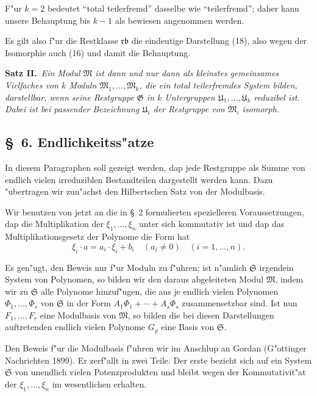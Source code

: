 \documentclass[12pt,a4paper]{article}
\begin{document}
F"ur $k=2$ bedeutet ``total teilerfremd'' dasselbe wie ``teilerfremd''; daher kann unsere Behauptung bis $k-1$ als bewiesen angenommen werden.

Es gilt also f"ur die Restklasse $\mathfrak{r}\mathfrak{b}$ die eindeutige Darstellung (18), also wegen der Isomorphie auch (16) und damit die Behauptung.

\smallskip
\noindent\textbf{Satz II.}\ \textit{Ein Modul $\mathfrak{M}$ ist dann und nur dann als kleinstes gemeinsames Vielfaches von $k$ Moduln $\mathfrak{M}_1,\ldots,\mathfrak{M}_k$, die ein total teilerfremdes System bilden, darstellbar, wenn seine Restgruppe $\mathfrak{G}$ in $k$ Untergruppen $\mathfrak{U}_1,\ldots,\mathfrak{U}_k$ reduzibel ist. Dabei ist bei passender Bezeichnung $\mathfrak{U}_i$ der Restgruppe von $\mathfrak{M}_i$ isomorph.}

\subsection*{\S\ 6. Endlichkeitss"atze}

In diesem Paragraphen soll gezeigt werden, dap jede Restgruppe als Summe von endlich vielen irreduziblen Bestandteilen dargestellt werden kann. Dazu "ubertragen wir zun"achst den Hilbertschen Satz von der Modulbasis.

Wir benutzen von jetzt an die in \S\ 2 formulierten spezielleren Voraussetzungen, dap die Multiplikation der $\xi_1,\ldots,\xi_n$ unter sich kommutativ ist und dap das Multiplikationsgesetz der Polynome die Form hat
\begin{equation}
\xi_i \cdot a = a_i \cdot \xi_i + b_i \quad (a_i \neq 0) \quad (i=1,\ldots,n). \tag{6}
\end{equation}

Es gen"ugt, den Beweis nur f"ur Moduln zu f"uhren; ist n"amlich $\mathfrak{S}$ irgendein System von Polynomen, so bilden wir den daraus abgeleiteten Modul $\mathfrak{M}$, indem wir zu $\mathfrak{S}$ alle Polynome hinzuf"ugen, die aus je endlich vielen Polynomen $\Phi_1,\ldots,\Phi_s$ von $\mathfrak{S}$ in der Form $A_1\Phi_1 + \cdots + A_s\Phi_s$ zusammensetzbar sind. Ist nun $F_1,\ldots,F_r$ eine Modulbasis von $\mathfrak{M}$, so bilden die bei diesen Darstellungen auftretenden endlich vielen Polynome $G_\varrho$ eine Basis von $\mathfrak{S}$.

Den Beweis f"ur die Modulbasis f"uhren wir im Anschlup an Gordan (G"ottinger Nachrichten 1899). Er zerf"allt in zwei Teile. Der erste bezieht sich auf ein System $\mathfrak{S}$ von unendlich vielen Potenzprodukten und bleibt wegen der Kommutativit"at der $\xi_1,\ldots,\xi_n$ im wesentlichen erhalten.
\end{document}
